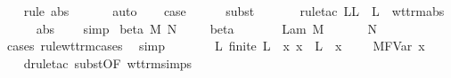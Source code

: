 \begin{isabellebody}
\ \ \isamarkupfalse%
\ {\isacharparenleft}rule\ abs{\isacharparenleft}{}{\isacharparenright}{\isacharparenright}\isanewline
\ \ \isamarkupfalse%
\ {}\ \isamarkupfalse%
\ auto\isanewline
\isanewline
\ \ \isamarkupfalse%
\ {\isacharquery}case\isanewline
\ \ \ \ \isamarkupfalse%
\ {\isacharparenleft}subst\ {}{\isacharparenleft}{}{\isacharparenright}{\isacharparenright}\isanewline
\ \ \ \ \isamarkupfalse%
\ {\isacharparenleft}rule{\isacharunderscore}tac\ L{\isacharequal}{\isachardoublequoteopen}L\ {\isasymunion}\ L{\isacharprime}{\isachardoublequoteclose}\ \ wt{\isacharunderscore}trm{\isachardot}abs{\isacharparenright}\isanewline
\ \ \ \ \isamarkupfalse%
\ abs\ {}\ {}\ \isamarkupfalse%
\ simp{\isacharplus}\isanewline
{}\isamarkupfalse%
\isanewline
{}\isamarkupfalse%
\ {\isacharparenleft}beta\ M\ N{\isacharparenright}\ \isanewline
\ \ \isamarkupfalse%
\ beta{\isacharparenleft}{}{\isacharparenright}\ \isamarkupfalse%
\ {\isasymtau}\ \ {}{\isacharcolon}\ {\isachardoublequoteopen}{\isasymGamma}\ {\isasymturnstile}\ {\isacharparenleft}Lam\ M{\isacharparenright}\ {\isacharcolon}\ {\isasymtau}\ {\isasymrightarrow}\ {\isasymsigma}{\isachardoublequoteclose}\ {\isachardoublequoteopen}{\isasymGamma}\ {\isasymturnstile}\ N\ {\isacharcolon}\ {\isasymtau}{\isachardoublequoteclose}\ \isanewline
\ \ \ \ \isamarkupfalse%
\ {\isacharparenleft}cases\ rule{\isacharcolon}wt{\isacharunderscore}trm{\isachardot}cases{\isacharparenright}\ \isamarkupfalse%
\ simp\isanewline
\ \ \isamarkupfalse%
\ {}{\isacharparenleft}{}{\isacharparenright}\ \isamarkupfalse%
\ {}{\isacharcolon}\ {\isachardoublequoteopen}{\isasymexists}L{\isachardot}\ finite\ L\ {\isasymand}\ {\isacharparenleft}{\isasymforall}x{\isachardot}\ x\ {\isasymnotin}\ L\ {\isasymlongrightarrow}\ {\isacharparenleft}x{\isacharcomma}\ {\isasymtau}{\isacharparenright}\ {\isacharhash}\ {\isasymGamma}\ {\isasymturnstile}\ M{\isacharcircum}FVar\ x\ {\isacharcolon}\ {\isasymsigma}{\isacharparenright}{\isachardoublequoteclose}\isanewline
\ \ \isamarkupfalse%
\ {\isacharparenleft}drule{\isacharunderscore}tac\ subst{\isacharbrackleft}OF\ wt{\isacharunderscore}trm{\isachardot}simps{\isacharbrackright}{\isacharparenright}\isanewline

\end{isabellebody}

